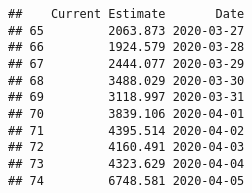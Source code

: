\documentclass[]{article}
\begin{document}
\begin{verbatim}
##    Current Estimate       Date
## 65         2063.873 2020-03-27
## 66         1924.579 2020-03-28
## 67         2444.077 2020-03-29
## 68         3488.029 2020-03-30
## 69         3118.997 2020-03-31
## 70         3839.106 2020-04-01
## 71         4395.514 2020-04-02
## 72         4160.491 2020-04-03
## 73         4323.629 2020-04-04
## 74         6748.581 2020-04-05
\end{verbatim}
\end{document}
